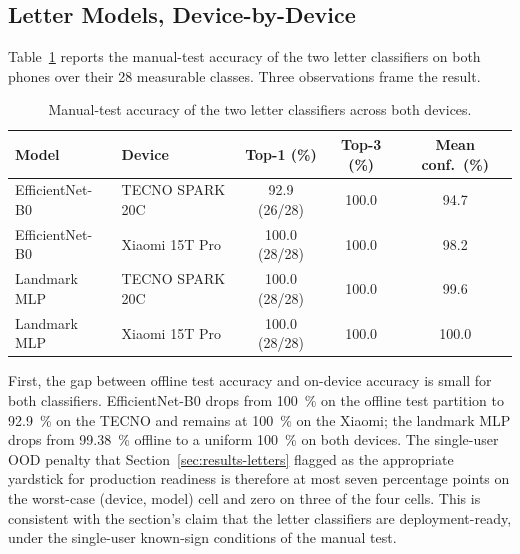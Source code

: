 \subsection{Letter Models, Device-by-Device}
\label{sec:results-qualitative-letters}

Table~\ref{tab:qual-letters} reports the manual-test accuracy of the
two letter classifiers on both phones over their 28 measurable
classes. Three observations frame the result.

\begin{table}[!ht]
\centering
\caption{Manual-test accuracy of the two letter classifiers across both devices.}
\label{tab:qual-letters}
\begin{tabular}{llccc}
\toprule
\textbf{Model} & \textbf{Device} & \textbf{Top-1 (\%)} & \textbf{Top-3 (\%)} & \textbf{Mean conf.\ (\%)} \\
\midrule
EfficientNet-B0 & TECNO SPARK 20C  &  92.9 (26/28) & 100.0 & 94.7 \\
EfficientNet-B0 & Xiaomi 15T Pro   & 100.0 (28/28) & 100.0 & 98.2 \\
Landmark MLP    & TECNO SPARK 20C  & 100.0 (28/28) & 100.0 & 99.6 \\
Landmark MLP    & Xiaomi 15T Pro   & 100.0 (28/28) & 100.0 & 100.0 \\
\bottomrule
\end{tabular}
\end{table}

First, the gap between offline test accuracy and on-device accuracy
is small for both classifiers. EfficientNet-B0 drops from
\SI{100}{\percent} on the offline test partition to \SI{92.9}{\percent}
on the TECNO and remains at \SI{100}{\percent} on the Xiaomi; the
landmark MLP drops from \SI{99.38}{\percent} offline to a uniform
\SI{100}{\percent} on both devices. The single-user OOD penalty that
Section~\ref{sec:results-letters} flagged as the appropriate yardstick
for production readiness is therefore at most seven percentage points
on the worst-case (device, model) cell and zero on three of the four
cells. This is consistent with the section's claim that
the letter classifiers are deployment-ready, under the single-user
known-sign conditions of the manual test.

